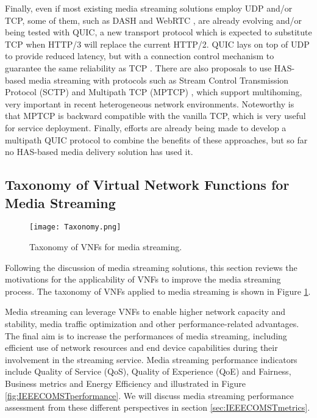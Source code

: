 Finally, even if most existing media streaming solutions employ UDP and/or TCP, some of them, such as DASH \cite{Bhat2017} and WebRTC \cite{W3CQuic}, are already evolving and/or being tested with QUIC, a new transport protocol which is expected to substitute TCP when HTTP/3 will replace the current HTTP/2. QUIC lays on top of UDP to provide reduced latency, but with a connection control mechanism to guarantee the same reliability as TCP \cite{Quic}. There are also proposals to use HAS-based media streaming with protocols such as Stream Control Transmission Protocol (SCTP) \cite{ong2002introduction} and Multipath TCP (MPTCP) \cite{ford2011architectural}, which support multihoming, very important in recent heterogeneous network environments. Noteworthy is that MPTCP is backward compatible with the vanilla TCP, which is very useful for service deployment. Finally, efforts are already being made to develop a multipath QUIC \cite{mp-quic} protocol to combine the benefits of these approaches, but so far no HAS-based media delivery solution has used it.


\subsection{Taxonomy of Virtual Network Functions for Media Streaming}
\label{sec:IEEECOMSTtaxonomy}

\begin{figure}[htp]
	\centering
	\texttt{[image: Taxonomy.png]}
	\vspace{-0.3cm}
	\caption{Taxonomy of VNFs for media streaming.}
	\label{fig:IEEECOMSTcomponents}
	\vspace{-0.5cm}
\end{figure}

Following the discussion of media streaming solutions, this section reviews the motivations for the applicability of VNFs to improve the media streaming process. The taxonomy of VNFs applied to media streaming is shown in Figure \ref{fig:IEEECOMSTcomponents}.

Media streaming can leverage VNFs to enable higher network capacity and stability, media traffic optimization and other performance-related advantages. The final aim is to increase the performances of media streaming, including efficient use of network resources and end device capabilities \cite{Evensen2014} during their involvement in the streaming service. Media streaming performance indicators include Quality of Service (QoS), Quality of Experience (QoE) and Fairness, Business metrics and Energy Efficiency and illustrated in Figure \ref{fig:IEEECOMSTperformance}. We will discuss media streaming performance assessment from these different perspectives in section \ref{sec:IEEECOMSTmetrics}.

